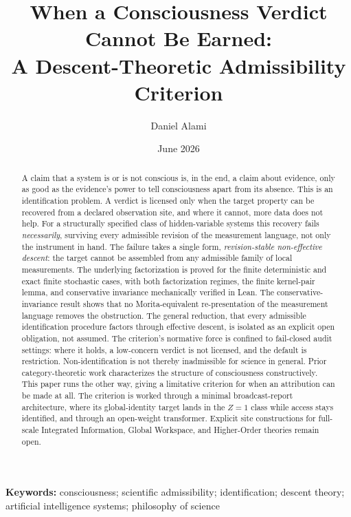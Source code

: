 \documentclass[11pt]{article}
\title{When a Consciousness Verdict Cannot Be Earned:\\
\large A Descent-Theoretic Admissibility Criterion}
\author{Daniel Alami}
\date{June 2026}
\begin{document}
\maketitle

\begin{abstract}

A claim that a system is or is not conscious is, in the end, a claim about
evidence, only as good as the evidence's power to tell consciousness apart from
its absence. This is an identification problem. A verdict is licensed only when
the target property can be recovered from a declared observation site, and where
it cannot, more data does not help. For a structurally specified class of
hidden-variable systems this recovery fails \emph{necessarily}, surviving every
admissible revision of the measurement language, not only the instrument in
hand. The failure takes a single form, \emph{revision-stable non-effective
descent}: the target cannot be assembled from any admissible family of local
measurements. The underlying factorization is proved for the finite
deterministic and exact finite stochastic cases, with both factorization
regimes, the finite kernel-pair lemma, and conservative invariance mechanically
verified in Lean. The conservative-invariance result shows that no
Morita-equivalent re-presentation of the measurement language removes the
obstruction. The general reduction, that every admissible identification
procedure factors through effective descent, is isolated as an explicit open
obligation, not assumed. The criterion's normative force is confined to
fail-closed audit settings: where it holds, a low-concern verdict is not
licensed, and the default is restriction. Non-identification is not thereby
inadmissible for science in general. Prior category-theoretic work characterizes
the structure of consciousness constructively. This paper runs the other way,
giving a limitative criterion for when an attribution can be made at all. The
criterion is worked through a minimal broadcast-report architecture, where its
global-identity target lands in the $Z = 1$ class while access stays identified,
and through an open-weight transformer. Explicit site constructions for full-scale
Integrated Information, Global Workspace, and Higher-Order theories remain open.
\end{abstract}

\noindent\textbf{Keywords:} consciousness; scientific admissibility;
identification; descent theory; artificial intelligence systems; philosophy of
science
\end{document}

